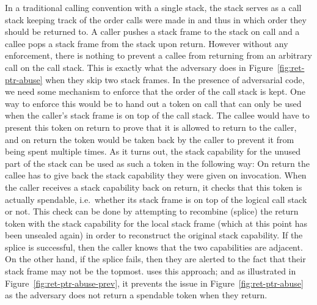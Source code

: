 \documentclass{jfp}
\begin{document}
In a traditional calling convention with a single stack, the stack serves as a call stack keeping track of the order calls were made in and thus in which order they should be returned to.
A caller pushes a stack frame to the stack on call and a callee pops a stack frame from the stack upon return.
However without any enforcement, there is nothing to prevent a callee from returning from an arbitrary call on the call stack.
This is exactly what the adversary does in Figure~\ref{fig:ret-ptr-abuse} when they skip two stack frames.
In the presence of adversarial code, we need some mechanism to enforce that the order of the call stack is kept.
One way to enforce this would be to hand out a token on call that can only be used when the caller's stack frame is on top of the call stack.
The callee would have to present this token on return to prove that it is allowed to return to the caller, and on return the token would be taken back by the caller to prevent it from being spent multiple times.
As it turns out, the stack capability for the unused part of the stack can be used as such a token in the following way:
On return the callee has to give back the stack capability they were given on invocation.
When the caller receives a stack capability back on return, it checks that this token is actually spendable, i.e.\ whether its stack frame is on top of the logical call stack or not.
This check can be done by attempting to recombine (splice) the return token with the stack capability for the local stack frame (which at this point has been unsealed again) in order to reconstruct the original stack capability.
If the splice is successful, then the caller knows that the two capabilities are adjacent. On the other hand, if the splice fails, then they are alerted to the fact that their stack frame may not be the topmost.
\stktokens{} uses this approach; and as illustrated in Figure~\ref{fig:ret-ptr-abuse-prev}, it prevents the issue in Figure~\ref{fig:ret-ptr-abuse} as the adversary does not return a spendable token when they return.
\end{document}
